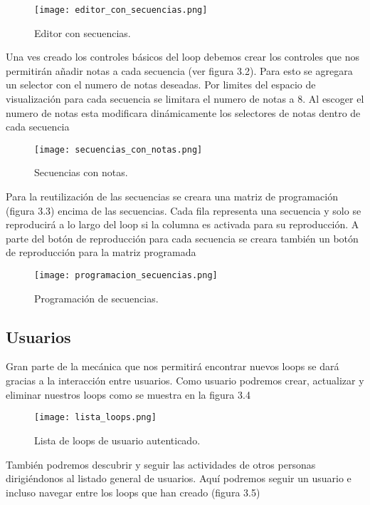 \begin{figure}
  \texttt{[image: editor\_con\_secuencias.png]}
  \caption{Editor con secuencias.}
  \label{fig:secuencia}
\end{figure}

Una ves creado los controles básicos del loop debemos crear los controles
que nos permitirán añadir notas a cada secuencia (ver figura 3.2). Para
esto se agregara un selector con el numero de notas deseadas. Por limites
del espacio de visualización para cada secuencia se limitara el numero de notas
a 8. Al escoger el numero de notas esta modificara dinámicamente los selectores
de notas dentro de cada secuencia

\begin{figure}
  \texttt{[image: secuencias\_con\_notas.png]}
  \caption{Secuencias con notas.}
  \label{fig:notas}
\end{figure}

Para la reutilización de las secuencias se creara una matriz de
programación (figura 3.3) encima de las secuencias. Cada fila representa una
secuencia y solo se reproducirá a lo largo del loop si la columna es
activada para su reproducción. A parte del botón de reproducción para
cada secuencia se creara también un botón de reproducción para la matriz
programada

\begin{figure}
  \texttt{[image: programacion\_secuencias.png]}
  \caption{Programación de secuencias.}
  \label{fig:programacion}
\end{figure}

\subsection{Usuarios}

Gran parte de la mecánica que nos permitirá encontrar nuevos loops
se dará gracias a la interacción entre usuarios. Como usuario podremos
crear, actualizar y eliminar nuestros loops como se muestra en la figura 3.4

\begin{figure}
  \texttt{[image: lista\_loops.png]}
  \caption{Lista de loops de usuario autenticado.}
  \label{fig:listaloops}
\end{figure}

También podremos descubrir y seguir las actividades de otros personas
dirigiéndonos al listado general de usuarios. Aquí podremos seguir un usuario
e incluso navegar entre los loops que han creado (figura 3.5)

